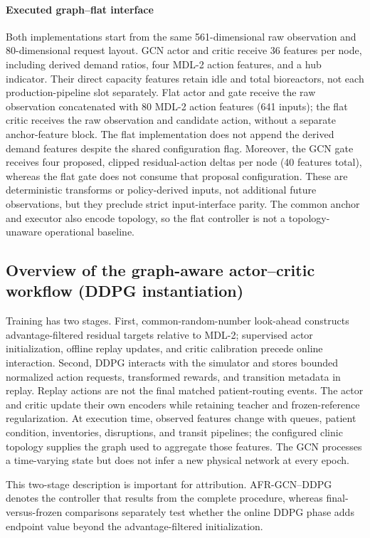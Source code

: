 \documentclass[preprint,review,12pt]{elsarticle}
\begin{document}
\paragraph{Executed graph--flat interface}
Both implementations start from the same 561-dimensional raw observation and
80-dimensional request layout. GCN actor and critic receive 36 features per
node, including derived demand ratios, four MDL-2 action features, and a hub
indicator. Their direct capacity features retain idle and total bioreactors,
not each production-pipeline slot separately. Flat actor and gate receive
the raw observation concatenated with 80 MDL-2 action features (641 inputs);
the flat critic receives the raw observation and candidate action, without a
separate anchor-feature block. The flat implementation does not append the
derived demand features despite the shared configuration flag. Moreover, the
GCN gate receives four proposed, clipped residual-action deltas per node
(40 features total), whereas the flat gate does not consume that proposal
configuration. These are deterministic transforms or policy-derived inputs,
not additional future observations, but they preclude strict input-interface
parity. The common anchor and executor also encode topology, so the flat
controller is not a topology-unaware operational baseline.
\subsection*{Overview of the graph-aware actor--critic workflow (DDPG instantiation)}

Training has two stages. First, common-random-number look-ahead constructs advantage-filtered residual targets relative to MDL-2; supervised actor initialization, offline replay updates, and critic calibration precede online interaction. Second, DDPG interacts with the simulator and stores bounded normalized action requests, transformed rewards, and transition metadata in replay. Replay actions are not the final matched patient-routing events. The actor and critic update their own encoders while retaining teacher and frozen-reference regularization. At execution time, observed features change with queues, patient condition, inventories, disruptions, and transit pipelines; the configured clinic topology supplies the graph used to aggregate those features. The GCN processes a time-varying state but does not infer a new physical network at every epoch.

This two-stage description is important for attribution. AFR-GCN--DDPG denotes the controller that results from the complete procedure, whereas final-versus-frozen comparisons separately test whether the online DDPG phase adds endpoint value beyond the advantage-filtered initialization.
\end{document}
